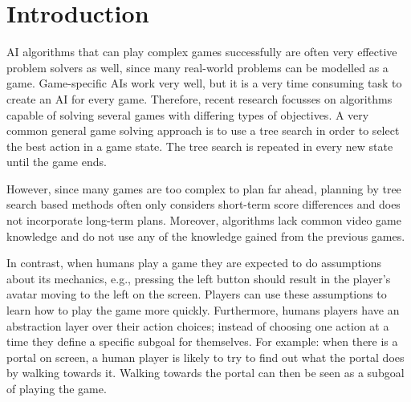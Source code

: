 \section{Introduction}
\label{sec:introduction}
%

AI algorithms that can play complex games successfully are often very effective
problem solvers as well, since many real-world problems can be modelled as a
game. Game-specific AIs work very well, but it is a very time consuming
task to create an AI for every game. Therefore, recent research focusses on
algorithms capable of solving several games with differing types of objectives.
A very common general game solving approach is to use a tree search in order to
select the best action in a game state. The tree search is repeated in every new
state until the game ends. 

However, since many games are too complex to plan far ahead, planning
by tree search based methods often only considers short-term score differences
and does not incorporate long-term plans. Moreover, algorithms lack common video game
knowledge and do not use any of the knowledge gained from the previous games.

In contrast, when humans play a game they are expected to do assumptions about
its mechanics, e.g., pressing the left button should result in the player's
avatar moving to the left on the screen. Players can use these assumptions to
learn how to play the game more quickly. Furthermore, humans players have an
abstraction layer over their action choices; instead of choosing one action at a
time they define a specific subgoal for themselves.  For example: when there is
a portal on screen, a human player is likely to try to find out what the portal
does by walking towards it. Walking towards the portal can then be seen as a
subgoal of playing the game.


